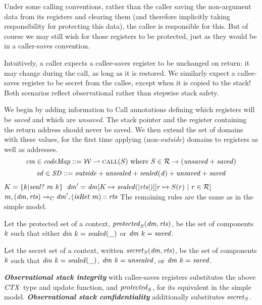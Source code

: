 \documentclass[acmsmall,review,anonymous]{acmart}\settopmatter{printfolios=true,printccs=false,printacmref=false}
\begin{document}
{{Under some calling conventions, rather than the caller saving the non-argument
data from its registers
and clearing them (and therefore implicitly taking responsibility for
protecting this data),
the callee is responsible for this. But of course we may still wish for
those registers to be
protected, just as they would be in a caller-saves convention.

Intuitively, a caller expects a callee-saves register to be unchanged on
return: it
may change during the call, as long as it is restored. We similarly expect a callee-saves
register to be secret from the callee, except when it is copied to the stack! Both scenarios
reflect observational rather than stepwise stack safety.

We begin by adding information to Call annotations defining which registers will be {\em saved}
and which are {\em unsaved}. The stack pointer and the register containing the return address
should never be saved. We then extend the set of domains with these values, for the first time applying
(non-{\em outside}) domains to registers as well as addresses.
%
\[\mathit{cm} \in \mathit{codeMap} ::= {\mathcal W} \rightharpoonup \text{\sc call}(S) ~ \mbox{\rm{where}} ~ S \in {\mathcal R} \rightarrow (\mathit{unsaved} + \mathit{saved})\]
%
\vspace{-3.5ex}
\[\mathit{sd} \in \mathit{SD} ::= \mathit{outside} + \mathit{unsealed} + \mathit{sealed(d)} + \mathit{unsaved} + \mathit{saved}\]
%
                  {\(K = \{k | \mathit{seal?} ~ m ~ k\}\)}
                  {\(\mathit{dm}' = \mathit{dm}[K \mapsto \mathit{sealed(|\mathit{rts}|)}][r \mapsto S(r) ~ | ~ r \in {\mathcal R}]\)}
                  {\(m,(\mathit{dm},\mathit{rts}) \xrightarrow{}_C \mathit{dm}',(\mathit{isRet} ~ m)::\mathit{rts}\)}
The remaining rules are the same as in the simple model.

 Let the protected set of a context, \(\mathit{protected}_S(\mathit{dm},\mathit{rts})\),
be the set of components \(k\) such that either \(\mathit{dm} ~ k = \mathit{sealed(\mbox{\_})}\)
or \(\mathit{dm} ~ k = \mathit{saved}\).

 Let the secret set of a context, written \(\mathit{secret}_S(\mathit{dm},\mathit{rts})\),
be the set of components \(k\) such that
\(\mathit{dm} ~ k = \mathit{sealed(\mbox{\_})}\), \(\mathit{dm} ~ k = \mathit{unsealed}\), or
\(\mathit{dm} ~ k = \mathit{saved}\).

%
\textbf{\em Observational stack integrity} with callee-saves registers substitutes the above
\(\mathit{CTX}\) type and update function, and \(\mathit{protected}_S\), for its equivalent in the simple model.
%
\textbf{\em Observational stack confidentiality} additionally substitutes \(\mathit{secret}_S\).

}}
\end{document}
